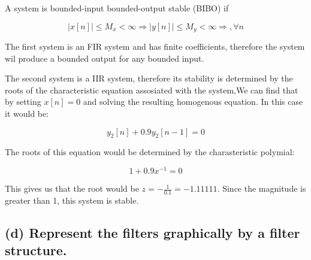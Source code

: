 A system is bounded-input bounded-output stable (BIBO) if

\begin{equation*}
    |x[n]| \leq M_{x}<\infty \Rightarrow|y[n]| \leq M_{y}<\infty \Rightarrow, \forall n
\end{equation*}

The first system is an FIR system and has finite coefficients, therefore the system wil produce a bounded output for any bounded input.

The second system is a IIR system, therefore its stability is determined by the roots of the characteristic equation assosiated with the system,We can find that by setting $x[n]=0$ and solving the resulting homogenous equation. In this case it would be:

\begin{equation*}
    y_2[n]+0.9y_2[n-1]=0
\end{equation*}

The roots of this equation would be determined by the charasteristic polymial:

\begin{equation*}
    1+0.9x^{-1}=0
\end{equation*}

This gives us that the  root would be $z=-\frac{1}{0.1}=-1.11111$. Since the magnitude is greater than 1, this system is stable.

\subsection*{(d) Represent the filters graphically by a filter structure.}

